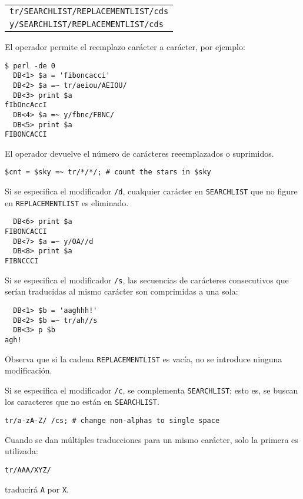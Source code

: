 \begin{tabular}{l}
\verb|tr/SEARCHLIST/REPLACEMENTLIST/cds|\\
\verb|y/SEARCHLIST/REPLACEMENTLIST/cds|\\
\end{tabular}

El operador permite el reemplazo carácter a carácter, por ejemplo:
\begin{verbatim}
$ perl -de 0
  DB<1> $a = 'fiboncacci'
  DB<2> $a =~ tr/aeiou/AEIOU/
  DB<3> print $a
fIbOncAccI
  DB<4> $a =~ y/fbnc/FBNC/
  DB<5> print $a
FIBONCACCI
\end{verbatim}
El operador devuelve el número de carácteres reeemplazados
o suprimidos. 
\begin{verbatim}
$cnt = $sky =~ tr/*/*/; # count the stars in $sky
\end{verbatim}

Si se especifica el modificador \verb|/d|, cualquier carácter en  \verb|SEARCHLIST|
que no figure en \verb|REPLACEMENTLIST| es eliminado.
\begin{verbatim}
  DB<6> print $a
FIBONCACCI
  DB<7> $a =~ y/OA//d
  DB<8> print $a
FIBNCCCI
\end{verbatim}


Si se especifica el modificador \verb|/s|, las secuencias de carácteres
consecutivos que serían traducidas al mismo carácter son comprimidas a una sola:

\begin{verbatim}
  DB<1> $b = 'aaghhh!'
  DB<2> $b =~ tr/ah//s
  DB<3> p $b
agh!
\end{verbatim}

Observa que si la cadena \verb|REPLACEMENTLIST| es vacía,
no se introduce ninguna modificación.

Si se especifica el modificador \verb|/c|, se complementa \verb|SEARCHLIST|;
esto es, se buscan los caracteres que no están en \verb|SEARCHLIST|.

\begin{verbatim}
tr/a-zA-Z/ /cs; # change non-alphas to single space
\end{verbatim}

Cuando se dan múltiples traducciones para un mismo carácter, solo la primera es utilizada:

\begin{verbatim}
tr/AAA/XYZ/
\end{verbatim}

traducirá \verb|A| por \verb|X|.

